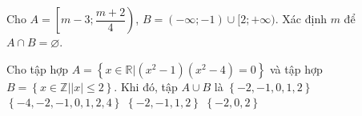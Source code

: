 \begin{bt}%
	Cho $A=\left[m-3; \dfrac{m+2}{4}\right)$, $B=(-\infty;-1) \cup [2;+\infty)$. Xác định $m$ để  ${A \cap B=\varnothing}$.
\end{bt}

\begin{ex}%
	Cho tập  hợp $A =\left\{x \in \mathbb{R} \big| (x^2 -1)(x^2 - 4) = 0\right\}$ và tập hợp $B = \left\{x \in \mathbb{Z} \big| |x| \leq 2 \right\}$. Khi đó, tập $A \cup B$ là
	\choice 
		{\True $\left\{-2, -1, 0,  1, 2\right\}$}
		{$\left\{-4, -2, -1, 0, 1,  2, 4\right\}$}
		{$\left\{-2,  -1, 1, 2\right\}$}
		{$\left\{-2, 0,  2\right\}$}
\end{ex}

